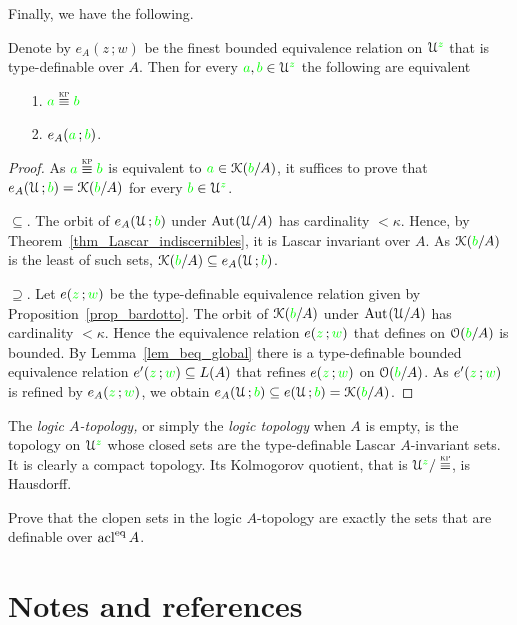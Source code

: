 Finally, we have the following.

\begin{theorem}\label{thm_Krupinski}
Denote by $e_A(z\,;w)$ be the finest bounded equivalence relation on $\EuScript U^{\color{green} z}$ that is type-definable over $A$.
Then for every ${\color{green} a}, {\color{green} b}\in\EuScript U^{\color{green} z}$ the following are equivalent
 \begin{itemize}
\item[1.] ${\gr a}\equivKP{\gr b}$
\item[2.] $e_A({\color{green} a}\,;{\color{green} b})$.
\end{itemize} 
\end{theorem}
\begin{proof} 
  As  ${\gr a}\equivKP{\gr b}$ is equivalent to ${\color{green} a}\in\EuScript K({\color{green} b}/A)$, it suffices to prove that $e_A(\EuScript U\,;{\color{green} b})=\EuScript K({\color{green} b}/A)$ for every ${\color{green} b}\in\EuScript U^{\color{green} z}$. 
 
  $\subseteq$. The orbit of $e_A(\EuScript U\,;{\color{green} b})$ under ${\rm Aut\kern.15ex}(\EuScript U/A)$ has cardinality $<\kappa$.
Hence, by Theorem~\ref{thm_Lascar_indiscernibles}, it is  Lascar invariant over $A$.
As $\EuScript K({\color{green} b}/A)$ is the least of such sets, $\EuScript K({\color{green} b}/A)\subseteq e_A(\EuScript U\,;{\color{green} b})$.
  
  $\supseteq$. Let $e({\color{green} z}\,;{\color{green} w})$ be the type-definable equivalence relation given by Proposition~\ref{prop_bardotto}. 
  The orbit of $\EuScript K({\color{green} b}/A)$ under ${\rm Aut\kern.15ex}(\EuScript U/A)$ has cardinality $<\kappa$. 
  Hence the equivalence relation $e({\color{green} z}\,;{\color{green} w})$ that defines on $\EuScript O({\color{green} b}/A)$ is bounded. 
  By Lemma~\ref{lem_beq_global} there is a type-definable bounded equivalence relation $e'({\color{green} z}\,;{\color{green} w})\subseteq L(A)$ that refines $e({\color{green} z}\,;{\color{green} w})$ on $\EuScript O({\color{green} b}/A)$. 
  As $e'({\color{green} z}\,;{\color{green} w})$ is refined by $e_A({\color{green} z}\,;{\color{green} w})$, we obtain $e_A(\EuScript U\,;{\color{green} b})\subseteq e(\EuScript U\,;{\color{green} b})=\EuScript K({\color{green} b}/A)$.
\end{proof}

The \emph{logic $A$-topology,} or simply the \emph{logic topology\/} when $A$ is empty, is the topology on $\EuScript U^{\color{green} z}$ whose closed sets are the type-definable Lascar $A$-invariant sets.
It is clearly a compact topology.
Its Kolmogorov quotient, that is $\U^{\gr z}/\equivKP$, is Hausdorff.

\begin{exercise}
Prove that the clopen sets in the logic $A$-topology are exactly the sets that are definable over $\mathop{\rm acl}^{{\rm eq}} A$.
\end{exercise}

\section{Notes and references}

